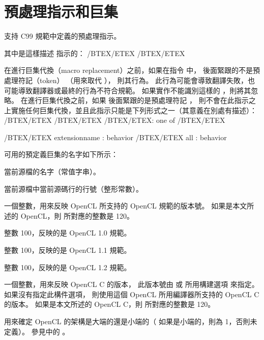 \section{預處理指示和巨集}

支持 C99 規範中定義的預處理指示。

其中是這樣描述  指示的：
\startclc
/BTEX/ETEX /BTEX{}/ETEX
\stopclc

在進行巨集代換（macro replacement）之前，如果在指令  中，
  後面緊跟的不是預處理符記（token） {}
（用來取代 {}），
則其行為。
此行為可能會導致翻譯失敗，也可能導致翻譯器或最終的行為不符合規範。
如果實作不能識別這樣的 ，則將其忽略。
在進行巨集代換之前，如果  後面緊跟的是預處理符記 {}，
則不會在此指示之上實施任何巨集代換，並且此指示只能是下列形式之一（其意義在別處有描述）：
\startclc
/BTEX/ETEX /BTEX/ETEX
	/BTEX/ETEX: one of /BTEX/ETEX

/BTEX/ETEX extensionname : behavior
/BTEX/ETEX all : behavior
\stopclc

可用的預定義巨集的名字如下所示：

當前源檔的名字（常值字串）。

當前源檔中當前源碼行的行號（整形常數）。

一個整數，用來反映 OpenCL  所支持的 OpenCL 規範的版本號。
如果是本文所述的 OpenCL，則  所對應的整數是 120。

整數 100，反映的是 OpenCL 1.0 規範。

整數 100，反映的是 OpenCL 1.1 規範。

整數 100，反映的是 OpenCL 1.2 規範。

一個整數，用來反映 OpenCL C 的版本，
此版本號由  或 
 所用構建選項  來指定。
如果沒有指定此構件選項，
則使用這個 OpenCL  所用編譯器所支持的 OpenCL C 的版本。
如果是本文所述的 OpenCL C，則  所對應的整數是 120。

用來確定 OpenCL  的架構是大端的還是小端的（
如果是小端的，則為 1，否則未定義）。
參見中的 。

